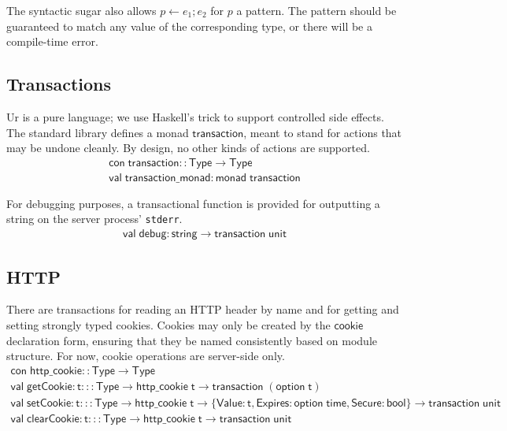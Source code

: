 \documentclass{article}
\newcommand{\mt}[1]{\mathsf{#1}}
\begin{document}
The syntactic sugar also allows $p \leftarrow e_1; e_2$ for $p$ a pattern.  The pattern should be guaranteed to match any value of the corresponding type, or there will be a compile-time error.

\subsection{Transactions}

Ur is a pure language; we use Haskell's trick to support controlled side effects.  The standard library defines a monad $\mt{transaction}$, meant to stand for actions that may be undone cleanly.  By design, no other kinds of actions are supported.
$$\begin{array}{l}
  \mt{con} \; \mt{transaction} :: \mt{Type} \to \mt{Type} \\
  \mt{val} \; \mt{transaction\_monad} : \mt{monad} \; \mt{transaction}
\end{array}$$

For debugging purposes, a transactional function is provided for outputting a string on the server process' \texttt{stderr}.
$$\begin{array}{l}
  \mt{val} \; \mt{debug} : \mt{string} \to \mt{transaction} \; \mt{unit}
\end{array}$$

\subsection{HTTP}

There are transactions for reading an HTTP header by name and for getting and setting strongly typed cookies.  Cookies may only be created by the $\mt{cookie}$ declaration form, ensuring that they be named consistently based on module structure.  For now, cookie operations are server-side only.
$$\begin{array}{l}
  \mt{con} \; \mt{http\_cookie} :: \mt{Type} \to \mt{Type} \\
  \mt{val} \; \mt{getCookie} : \mt{t} ::: \mt{Type} \to \mt{http\_cookie} \; \mt{t} \to \mt{transaction} \; (\mt{option} \; \mt{t}) \\
  \mt{val} \; \mt{setCookie} : \mt{t} ::: \mt{Type} \to \mt{http\_cookie} \; \mt{t} \to \{\mt{Value} : \mt{t}, \mt{Expires} : \mt{option} \; \mt{time}, \mt{Secure} : \mt{bool}\} \to \mt{transaction} \; \mt{unit} \\
  \mt{val} \; \mt{clearCookie} : \mt{t} ::: \mt{Type} \to \mt{http\_cookie} \; \mt{t} \to \mt{transaction} \; \mt{unit}
\end{array}$$
\end{document}
